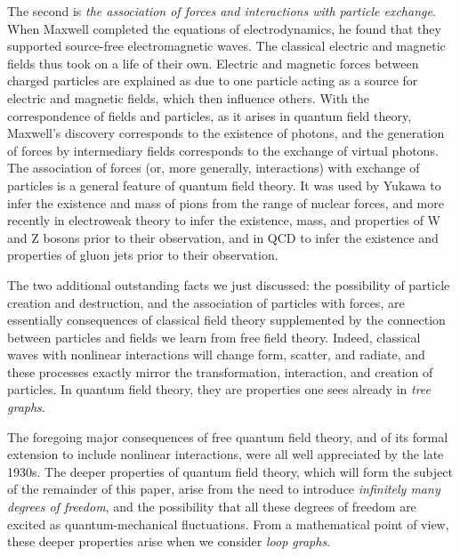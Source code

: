 \documentclass[aps,epsf]{revtex4}
\begin{document}
The second is {\it the association of forces and
interactions with particle exchange}.  When Maxwell completed the
equations of electrodynamics, he found that they supported source-free
electromagnetic waves.  The classical electric and magnetic fields
thus took on a life of their own.  Electric and magnetic forces
between charged particles are explained as due to one particle acting
as a source for electric and magnetic fields, which then influence
others.  With the correspondence of fields and particles, as it arises
in quantum field theory, Maxwell's discovery corresponds to the
existence of photons, and the generation of forces by intermediary
fields corresponds to the exchange of virtual photons.  The
association of forces (or, more generally, interactions) with exchange
of particles is a general feature of quantum field theory.  It was
used by Yukawa to infer the existence and mass of pions from the range
of nuclear forces, and more recently in electroweak theory to infer
the existence, mass, and properties of W and Z bosons prior to their
observation, and in QCD to infer the existence and properties of gluon
jets prior to their observation.

The two additional outstanding facts we just discussed: the
possibility of particle creation and destruction, and the association
of particles with forces, are essentially consequences of classical
field theory supplemented by the connection between particles and
fields we learn from free field theory.  Indeed, classical waves with
nonlinear interactions will change form, scatter, and radiate, and
these processes exactly mirror the transformation, interaction, and
creation of particles.  In quantum field theory, they are properties
one sees already in {\it tree graphs}.

The foregoing major consequences of free quantum field
theory, and of its formal extension to include nonlinear interactions,
were all well appreciated by the late 1930s.  The deeper properties of
quantum field theory, which will form the subject of the remainder of
this paper, arise from the need to introduce {\it infinitely many
degrees of freedom}, and the possibility that all these degrees of
freedom are excited as quantum-mechanical fluctuations.  From a
mathematical point of view, these deeper properties arise when we
consider {\it loop graphs}.  
\end{document}
